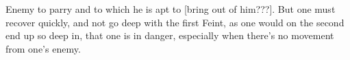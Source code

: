 \newpage


\newpage


Enemy to parry and to which he is apt to [bring out of
him???]. But one must recover quickly, and not go  deep with the
first Feint, as one would on the second end up so deep in, that one is
in danger, especially when there's no movement from one's enemy.


